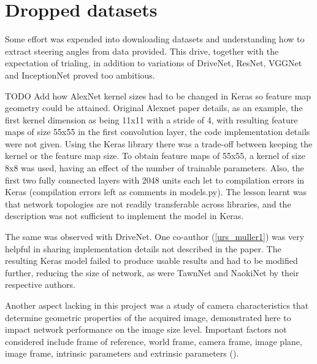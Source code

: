 \section{Dropped datasets}
Some effort was expended into downloading datasets and understanding how to extract steering angles from data provided. This drive, together with the expectation of trialing, in addition to variations of DriveNet, ResNet, VGGNet and InceptionNet proved too ambitious.   

TODO Add how AlexNet kernel sizes had to be changed in Keras so feature map geometry could be attained. Original Alexnet paper details, as an example, the first kernel dimension as being 11x11 with a stride of 4, with resulting feature maps of size 55x55 in the first convolution layer, the code implementation details were not given. Using the Keras library there was a trade-off between keeping the kernel or the feature map size. To obtain feature maps of 55x55, a kernel of size 8x8 was used, having an effect of the number of trainable parameters. 
Also, the first two fully connected layers with 2048 units each let to compilation errors in Keras (compilation errors left as comments in models.py). The lesson learnt was that network topologies are not readily transferable across libraries, and the description was not sufficient to implement the model in Keras.  

The same was observed with DriveNet. One co-author (\ref{urs_muller1}) was very helpful in sharing implementation details not described in the paper. The resulting Keras model failed to produce usable results and had to be modified further, reducing the size of network, as were TawnNet and NaokiNet by their respective authors.


Another aspect lacking in this project was a study of camera characteristics that determine geometric properties of the acquired image, demonstrated here to impact network performance on the image size level. Important factors not considered include frame of reference, world frame, camera frame, image plane, image frame, intrinsic parameters and extrinsic parameters (\cite{Sala2006}).

